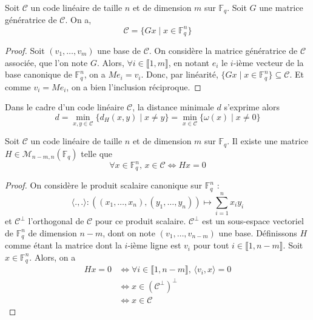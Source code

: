 	\begin{proposition}
		Soit $\mathcal{C}$ un code linéaire de taille $n$ et de dimension $m$ sur $\mathbb{F}_q$. Soit $G$ une matrice génératrice de $\mathcal{C}$. On a,
		\[ \mathcal{C} = \{ Gx \mid x \in \mathbb{F}_q^n \} \]
	\end{proposition}
	
	\begin{proof}
		Soit $(v_1, \dots, v_m)$ une base de $\mathcal{C}$. On considère la matrice génératrice de $\mathcal{C}$ associée, que l'on note $G$.
		\newpar
		Alors, $\forall i \in \llbracket 1, m \rrbracket$, en notant $e_i$ le $i$-ième vecteur de la base canonique de $\mathbb{F}_q^n$, on a $Me_i = v_i$. Donc, par linéarité, $\{ Gx \mid x \in \mathbb{F}_q^n \} \subseteq \mathcal{C}$.
		Et comme $v_i = Me_i$, on a bien l'inclusion réciproque.
	\end{proof}
	
	\begin{remark}
		Dans le cadre d'un code linéaire $\mathcal{C}$, la distance minimale $d$ s'exprime alors
		\[ d = \min_{x,y \in \mathcal{C}} \{ d_H(x,y) \mid x \neq y \} = \min_{x \in \mathcal{C}} \{ \omega(x) \mid x \neq 0 \} \]
	\end{remark}
	
	\begin{proposition}
		Soit $\mathcal{C}$ un code linéaire de taille $n$ et de dimension $m$ sur $\mathbb{F}_q$. Il existe une matrice $H \in \mathcal{M}_{n-m,n}(\mathbb{F}_q)$ telle que
		\[ \forall x \in \mathbb{F}_q^n, \, x \in \mathcal{C} \iff Hx = 0 \]
	\end{proposition}
	
	\begin{proof}
		On considère le produit scalaire canonique sur $\mathbb{F}_q^n$ :
		\[ \langle ., . \rangle : ((x_1, \dots, x_n), (y_1, \dots, y_n)) \mapsto \sum_{i=1}^n x_iy_i \]
		et $\mathcal{C}^\perp$ l'orthogonal de $\mathcal{C}$ pour ce produit scalaire. $\mathcal{C}^\perp$ est un sous-espace vectoriel de $\mathbb{F}_q^n$ de dimension $n-m$, dont on note $(v_1, \dots, v_{n-m})$ une base. Définissons $H$ comme étant la matrice dont la $i$-ième ligne est $v_i$ pour tout $i \in \llbracket 1, n-m \rrbracket$.  Soit $x \in \mathbb{F}_q^n$. Alors, on a
		\begin{align*}
			Hx = 0 &\iff \forall i \in \llbracket 1, n-m \rrbracket, \, \langle v_i, x \rangle = 0 \\
			&\iff x \in (\mathcal{C}^\perp)^\perp \\
			&\iff x \in \mathcal{C}
		\end{align*}
	\end{proof}
	
